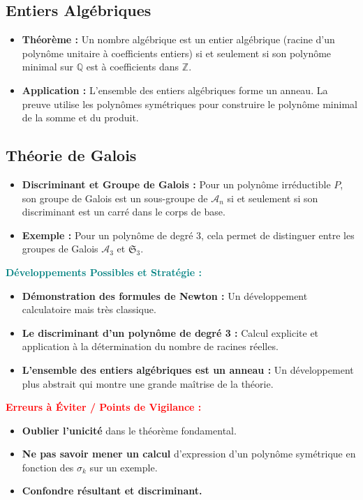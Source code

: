 \documentclass[12pt, a4paper, parskip=full]{report}
\theoremstyle{agregstyle}
\newenvironment{developpements}
  {\par\medskip\noindent\begin{oframed}\noindent\textbf{\textcolor{teal}{Développements Possibles et Stratégie :}}}
  {\end{oframed}\par\medskip}
\newenvironment{erreurs}
  {\par\medskip\noindent\begin{oframed}\noindent\textbf{\textcolor{red}{Erreurs à Éviter / Points de Vigilance :}}}
  {\end{oframed}\par\medskip}
\begin{document}
\subsection{Entiers Algébriques}
\begin{itemize}
    \item \textbf{Théorème :} Un nombre algébrique est un entier algébrique (racine d'un polynôme unitaire à coefficients entiers) si et seulement si son polynôme minimal sur $\mathbb{Q}$ est à coefficients dans $\mathbb{Z}$.
    \item \textbf{Application :} L'ensemble des entiers algébriques forme un anneau. La preuve utilise les polynômes symétriques pour construire le polynôme minimal de la somme et du produit.
\end{itemize}
\subsection{Théorie de Galois}
\begin{itemize}
    \item \textbf{Discriminant et Groupe de Galois :} Pour un polynôme irréductible $P$, son groupe de Galois est un sous-groupe de $\mathcal{A}_n$ si et seulement si son discriminant est un carré dans le corps de base.
    \item \textbf{Exemple :} Pour un polynôme de degré 3, cela permet de distinguer entre les groupes de Galois $\mathcal{A}_3$ et $\mathfrak{S}_3$.
\end{itemize}

\begin{developpements}
    \begin{itemize}
        \item \textbf{Démonstration des formules de Newton :} Un développement calculatoire mais très classique.
        \item \textbf{Le discriminant d'un polynôme de degré 3 :} Calcul explicite et application à la détermination du nombre de racines réelles.
        \item \textbf{L'ensemble des entiers algébriques est un anneau :} Un développement plus abstrait qui montre une grande maîtrise de la théorie.
    \end{itemize}
\end{developpements}

\begin{erreurs}
    \begin{itemize}
        \item \textbf{Oublier l'unicité} dans le théorème fondamental.
        \item \textbf{Ne pas savoir mener un calcul} d'expression d'un polynôme symétrique en fonction des $\sigma_k$ sur un exemple.
        \item \textbf{Confondre résultant et discriminant.}
    \end{itemize}
\end{erreurs}
\end{document}
